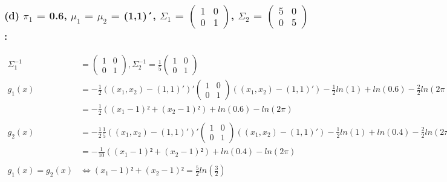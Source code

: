 \documentclass[a4paper, 10pt]{article}
\begin{document}
\subsubsection*{(d) $\pi_{1}$ = 0.6, $\mu_{1}$ = $\mu_{2}$ = (1,1)´, $\Sigma_{1}$ = $\begin{pmatrix} 1 & 0 \\ 0 & 1 \end{pmatrix}$,
$\Sigma_{2}$ =  $\begin{pmatrix} 5 & 0 \\ 0 & 5 \end{pmatrix}$ :}
\begin{align*}
\Sigma_{1}^{-1} &= \begin{pmatrix} 1 & 0 \\ 0 & 1 \end{pmatrix}, \Sigma_{2}^{-1} = \frac{1}{5} \begin{pmatrix} 1 & 0 \\ 0 & 1 \end{pmatrix}\\
g_{1}(x) &= -\frac{1}{2} ((x_{1}, x_{2}) - (1, 1)')' \begin{pmatrix} 1 & 0 \\ 0 & 1 \end{pmatrix} ((x_{1}, x_{2}) - (1, 1)') -
\frac{1}{2} ln(1) + ln(0.6) - \frac{2}{2} ln(2\pi)\\
	 &= -\frac{1}{2} ((x_{1} - 1)² + (x_{2} - 1)²) + ln(0.6) - ln(2 \pi)\\ \\
g_{2}(x) &= -\frac{1}{2} \frac{1}{5} ((x_{1}, x_{2}) - (1, 1)')' \begin{pmatrix} 1 & 0 \\ 0 & 1 \end{pmatrix} ((x_{1}, x_{2}) - (1, 1)') -
\frac{1}{2} ln(1) + ln(0.4) - \frac{2}{2} ln(2\pi)\\
	 &= -\frac{1}{10} ((x_{1} - 1)² + (x_{2} - 1)²) + ln(0.4) - ln(2 \pi)\\ \\
g_{1}(x) = g_{2}(x) &\Leftrightarrow (x_{1} - 1)² + (x_{2} - 1)² = \frac{5}{2} ln(\frac{3}{2})
\end{align*}\\
\end{document}
